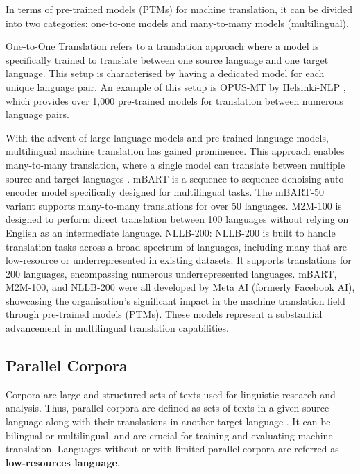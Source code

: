 \documentclass[a4paper]{article}
\begin{document}
In terms of pre-trained models (PTMs) for machine translation, it can be divided into two categories: one-to-one models and many-to-many models (multilingual).

One-to-One Translation refers to a translation approach where a model is specifically trained to translate between one source language and one target language. This setup is characterised by having a dedicated model for each unique language pair. An example of this setup is OPUS-MT by Helsinki-NLP \cite{tiedemann-2023-democratizing,tiedemann-2020-opus-mt}, which provides over 1,000 pre-trained models for translation between numerous language pairs.

With the advent of large language models and pre-trained language models, multilingual machine translation has gained prominence. This approach enables many-to-many translation, where a single model can translate between multiple source and target languages \cite{aharoni-2019-massively-multilingual}. mBART \cite{liu-2020-mbart} is a sequence-to-sequence denoising auto-encoder model specifically designed for multilingual tasks. The mBART-50 variant supports many-to-many translations for over 50 languages. M2M-100 \cite{fan-2020-m2m100} is designed to perform direct translation between 100 languages without relying on English as an intermediate language. NLLB-200: NLLB-200 \cite{nllb200-2020} is built to handle translation tasks across a broad spectrum of languages, including many that are low-resource or underrepresented in existing datasets. It supports translations for 200 languages, encompassing numerous underrepresented languages. mBART, M2M-100, and NLLB-200 were all developed by Meta AI (formerly Facebook AI), showcasing the organisation's significant impact in the machine translation field through pre-trained models (PTMs). These models represent a substantial advancement in multilingual translation capabilities.

\subsection{Parallel Corpora}

Corpora are large and structured sets of texts used for linguistic research and analysis. Thus, parallel corpora are defined as sets of texts in a given source language along with their translations in another target language \cite{lefer-2020-parallel-corpora}. It can be bilingual or multilingual, and are crucial for training and evaluating machine translation. Languages without or with limited parallel corpora are referred as \textbf{low-resources language}.
\end{document}
